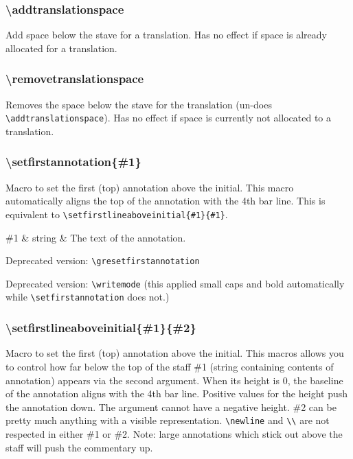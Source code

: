 \subsubsection*{\textbackslash addtranslationspace}
Add space below the stave for a translation.  Has no effect if space
is already allocated for a translation.

\subsubsection*{\textbackslash removetranslationspace}
Removes the space below the stave for the translation (un-does\\
\verb=\addtranslationspace=). Has no effect if space is currently not
allocated to a translation.

\subsubsection*{\textbackslash setfirstannotation\{\#1\}}
Macro to set the first (top) annotation above the initial.  This macro
automatically aligns the top of the annotation with the 4th bar line.
This is equivalent to \verb=\setfirstlineaboveinitial{#1}{#1}=.

\begin{argtable}
  \#1 & string & The text of the annotation.\\
\end{argtable}

\smallskip\hskip 15pt Deprecated version: \verb=\gresetfirstannotation=

\smallskip\hskip 15pt Deprecated version: \verb=\writemode= (\nb this
applied small caps and bold automatically while
\verb=\setfirstannotation= does
not.)%

\subsubsection*{\textbackslash setfirstlineaboveinitial\{\#1\}\{\#2\}}
Macro to set the first (top) annotation above the initial.  This
macros allows you to control how far below the top of the staff \#1
(string containing contents of annotation) appears via the second
argument.  When its height is 0, the baseline of the annotation aligns
with the 4th bar line.  Positive values for the height push the
annotation down.  The argument cannot have a negative height.  \#2 can
be pretty much anything with a visible representation.
\verb=\newline= and \verb=\\= are not respected in either \#1 or \#2.
Note: large annotations which stick out above the staff will push the
commentary up.

